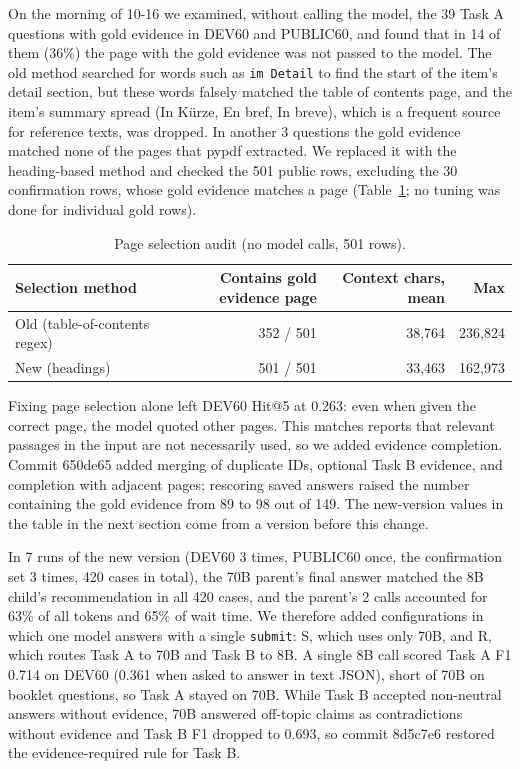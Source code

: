 \documentclass[10pt,a4paper]{article}
\begin{document}
On the morning of 10-16 we examined, without calling the model, the 39 Task A questions with gold evidence in DEV60 and PUBLIC60, and found that in 14 of them (36\%) the page with the gold evidence was not passed to the model.
The old method searched for words such as \texttt{im Detail} to find the start of the item's detail section, but these words falsely matched the table of contents page, and the item's summary spread (In Kürze, En bref, In breve), which is a frequent source for reference texts, was dropped. In another 3 questions the gold evidence matched none of the pages that pypdf extracted.
We replaced it with the heading-based method and checked the 501 public rows, excluding the 30 confirmation rows, whose gold evidence matches a page (Table~\ref{tab:audit}; no tuning was done for individual gold rows).

\begin{table}[t]
  \centering
  \caption{Page selection audit (no model calls, 501 rows).}
  \label{tab:audit}
  \small
  \begin{tabular}{lrrr}
    \toprule
    Selection method & Contains gold evidence page & Context chars, mean & Max \\
    \midrule
    Old (table-of-contents regex) & 352 / 501 & 38,764 & 236,824 \\
    New (headings) & 501 / 501 & 33,463 & 162,973 \\
    \bottomrule
  \end{tabular}
\end{table}

Fixing page selection alone left DEV60 Hit@5 at 0.263: even when given the correct page, the model quoted other pages. This matches reports that relevant passages in the input are not necessarily used\cite{liu2023lost,hsieh2024ruler}, so we added evidence completion.
Commit 650de65 added merging of duplicate IDs, optional Task B evidence, and completion with adjacent pages; rescoring saved answers raised the number containing the gold evidence from 89 to 98 out of 149. The new-version values in the table in the next section come from a version before this change.

In 7 runs of the new version (DEV60 3 times, PUBLIC60 once, the confirmation set 3 times, 420 cases in total), the 70B parent's final answer matched the 8B child's recommendation in all 420 cases, and the parent's 2 calls accounted for 63\% of all tokens and 65\% of wait time.
We therefore added configurations in which one model answers with a single \texttt{submit}: S, which uses only 70B, and R, which routes Task A to 70B and Task B to 8B.
A single 8B call scored Task A F1 0.714 on DEV60 (0.361 when asked to answer in text JSON), short of 70B on booklet questions, so Task A stayed on 70B.
While Task B accepted non-neutral answers without evidence, 70B answered off-topic claims as contradictions without evidence and Task B F1 dropped to 0.693, so commit 8d5c7e6 restored the evidence-required rule for Task B.
\end{document}
